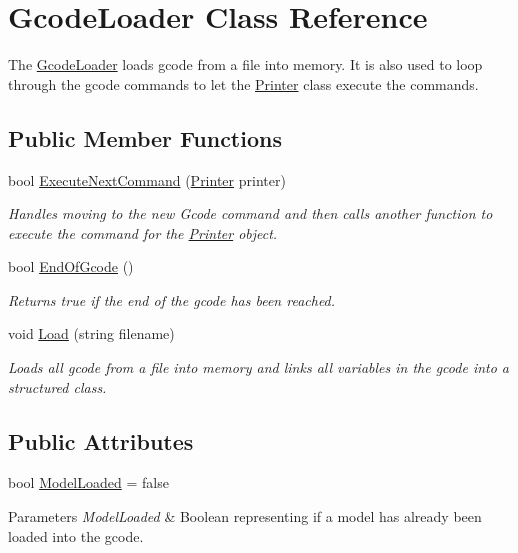 \hypertarget{class_gcode_loader}{}\section{Gcode\+Loader Class Reference}
\label{class_gcode_loader}


The \hyperlink{class_gcode_loader}{Gcode\+Loader} loads gcode from a file into memory. It is also used to loop through the gcode commands to let the \hyperlink{class_printer}{Printer} class execute the commands.  


\subsection*{Public Member Functions}
\begin{DoxyCompactItemize}
\item 
bool \hyperlink{class_gcode_loader_a295f2e6de27384942c01024adf7a0615}{Execute\+Next\+Command} (\hyperlink{class_printer}{Printer} printer)
\begin{DoxyCompactList}\small\item\em Handles moving to the new Gcode command and then calls another function to execute the command for the \hyperlink{class_printer}{Printer} object. \end{DoxyCompactList}\item 
bool \hyperlink{class_gcode_loader_a6b8aedf9e1c0b90d931626697bc9c3de}{End\+Of\+Gcode} ()
\begin{DoxyCompactList}\small\item\em Returns true if the end of the gcode has been reached. \end{DoxyCompactList}\item 
void \hyperlink{class_gcode_loader_a921de7da9cc2e377a52977f30f8c1204}{Load} (string filename)
\begin{DoxyCompactList}\small\item\em Loads all gcode from a file into memory and links all variables in the gcode into a structured class. \end{DoxyCompactList}\end{DoxyCompactItemize}
\subsection*{Public Attributes}
\begin{DoxyCompactItemize}
\item 
\mbox{\label{class_gcode_loader_a5c5558ee51ad2dc684951b4e69e95112}} 
bool \hyperlink{class_gcode_loader_a5c5558ee51ad2dc684951b4e69e95112}{Model\+Loaded} = false
\begin{DoxyCompactList}\small\item\em 
\begin{DoxyParams}{Parameters}
{\em Model\+Loaded} & Boolean representing if a model has already been loaded into the gcode.\\
\hline
\end{DoxyParams}
\end{DoxyCompactList}\end{DoxyCompactItemize}

